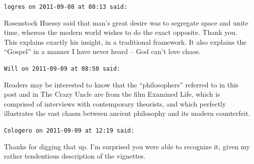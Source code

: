 \begin{footnotesize}
\begin{sffamily}
\texttt{logres on 2011-09-08 at 08:13 said:}

Rosenstock Huessy said that man's great desire was to segregate space and unite time, whereas the modern world wishes to do the exact opposite. Thank you. This explains exactly his insight, in a traditional framework. It also explains the ``Gospel'' in a manner I have never heard -- God can't love chaos.

\hfill

\texttt{Will on 2011-09-09 at 08:50 said:}

Readers may be interested to know that the ``philosophers'' referred to in this post and in The Crazy Uncle are from the film Examined Life, which is comprised of interviews with contemporary theorists, and which perfectly illustrates the vast chasm between ancient philosophy and its modern counterfeit.

\hfill

\texttt{Cologero on 2011-09-09 at 12:19 said:}

Thanks for digging that up. I'm surprised you were able to recognize it, given my rather tendentious description of the vignettes.


\hfill

\end{sffamily}
\end{footnotesize}


